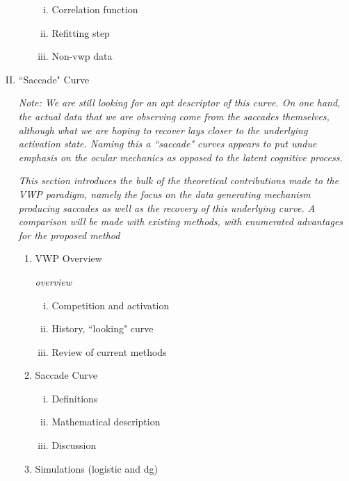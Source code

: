 \documentclass[12pt, letterpaper, twoside]{article}
\begin{document}
\begin{enumerate}[I.]
\begin{enumerate}[1.]
    \begin{enumerate}[i.]
    \item Correlation function
    \item Refitting step
    \item Non-vwp data
    \end{enumerate}
  \end{enumerate}
\item ``Saccade" Curve

\textit{Note: We are still looking for an apt descriptor of this curve. On one hand, the actual data that we are observing come from the saccades themselves, although what we are hoping to recover lays closer to the underlying activation state. Naming this a ``saccade" curves appears to put undue emphasis on the ocular mechanics as opposed to the latent cognitive process. } 

\textit{This section introduces the bulk of the theoretical contributions made to the VWP paradigm, namely the focus on the data generating mechanism producing saccades as well as the recovery of this underlying curve. A comparison will be made with existing methods, with enumerated advantages for the proposed method}

  \begin{enumerate}[1.]
  \item VWP Overview

\textit{overview}  
  
    \begin{enumerate}[i.]
    \item Competition and activation
    \item History, ``looking" curve
    \item Review of current methods
    \end{enumerate}
  \item Saccade Curve
    \begin{enumerate}[i.]
    \item Definitions
    \item Mathematical description
    \item Discussion
    \end{enumerate}
  \item Simulations (logistic and dg)



\end{enumerate}
\end{enumerate}
\end{document}
